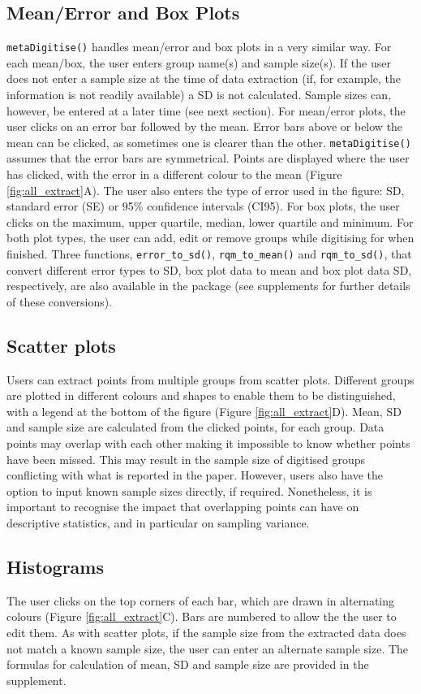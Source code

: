 \documentclass[12pt]{article}
\newcommand{\fct}[1]{\texttt{#1()}}
\begin{document}
\subsection{Mean/Error and Box Plots} 
\fct{metaDigitise} handles mean/error and box plots in a very similar way. For each mean/box, the user enters group name(s) and sample size(s). If the user does not enter a sample size at the time of data extraction (if, for example, the information is not readily available) a SD is not calculated. Sample sizes can, however, be entered at a later time (see next section). For mean/error plots, the user clicks on an error bar followed by the mean. Error bars above or below the mean can be clicked, as sometimes one is clearer than the other. \fct{metaDigitise} assumes that the error bars are symmetrical. Points are displayed where the user has clicked, with the error in a different colour to the mean (Figure \ref{fig:all_extract}A). The user also enters the type of error used in the figure: SD, standard error (SE) or 95\% confidence intervals (CI95). For box plots, the user clicks on the maximum, upper quartile, median, lower quartile and minimum. For both plot types, the user can add, edit or remove groups while digitising for when finished. Three functions, \fct{error\_to\_sd}, \fct{rqm\_to\_mean} and \fct{rqm\_to\_sd}, that convert different error types to SD, box plot data to mean and box plot data SD, respectively, are also available in the package (see supplements for further details of these conversions).

\subsection{Scatter plots}
Users can extract points from multiple groups from scatter plots. Different groups are plotted in different colours and shapes to enable them to be distinguished, with a legend at the bottom of the figure (Figure \ref{fig:all_extract}D). Mean, SD and sample size are calculated from the clicked points, for each group. Data points may overlap with each other making it impossible to know whether points have been missed. This may result in the sample size of digitised groups conflicting with what is reported in the paper. However, users also have the option to input known sample sizes directly, if required. Nonetheless, it is important to recognise the impact that overlapping points can have on descriptive statistics, and in particular on sampling variance.

\subsection{Histograms}
The user clicks on the top corners of each bar, which are drawn in alternating colours (Figure \ref{fig:all_extract}C). Bars are numbered to allow the the user to edit them. As with scatter plots, if the sample size from the extracted data does not match a known sample size, the user can enter an alternate sample size. The formulas for calculation of mean, SD and sample size are provided in the supplement.
\end{document}
